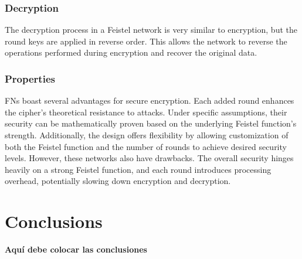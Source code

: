 \documentclass[conference]{IEEEtran}
\begin{document}
\subsubsection{Decryption}
The decryption process in a Feistel network is very similar to encryption, but the round keys are applied in reverse order. This allows the network to reverse the operations performed during encryption and recover the original data.
\subsubsection{Properties}
FNs boast several advantages for secure encryption. Each added round enhances the cipher's theoretical resistance to attacks. Under specific assumptions, their security can be mathematically proven based on the underlying Feistel function's strength. Additionally, the design offers flexibility by allowing customization of both the Feistel function and the number of rounds to achieve desired security levels. However, these networks also have drawbacks. The overall security hinges heavily on a strong Feistel function, and each round introduces processing overhead, potentially slowing down encryption and decryption.


\section{Conclusions}
\textbf{Aquí debe colocar las conclusiones}



\vspace{12pt}
\end{document}
